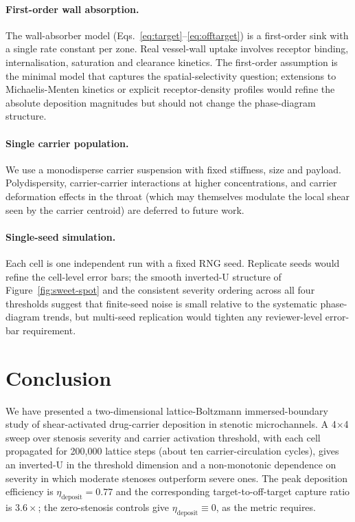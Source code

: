 \documentclass[11pt,a4paper]{article}
\begin{document}
\paragraph{First-order wall absorption.}
The wall-absorber model
(Eqs.~\ref{eq:target}--\ref{eq:offtarget}) is a first-order
sink with a single rate constant per zone. Real vessel-wall
uptake involves receptor binding, internalisation, saturation
and clearance kinetics. The first-order assumption is the
minimal model that captures the spatial-selectivity question;
extensions to Michaelis-Menten kinetics or explicit
receptor-density profiles would refine the absolute deposition
magnitudes but should not change the phase-diagram structure.

\paragraph{Single carrier population.}
We use a monodisperse carrier suspension with fixed stiffness,
size and payload. Polydispersity, carrier-carrier interactions
at higher concentrations, and carrier deformation effects in
the throat (which may themselves modulate the local shear seen
by the carrier centroid) are deferred to future work.

\paragraph{Single-seed simulation.}
Each cell is one independent run with a fixed RNG seed.
Replicate seeds would refine the cell-level error bars; the
smooth inverted-U structure of Figure~\ref{fig:sweet-spot} and
the consistent severity ordering across all four thresholds
suggest that finite-seed noise is small relative to the
systematic phase-diagram trends, but multi-seed replication
would tighten any reviewer-level error-bar requirement.

\section{Conclusion}
\label{sec:conclusion}

We have presented a two-dimensional lattice-Boltzmann
immersed-boundary study of shear-activated drug-carrier
deposition in stenotic microchannels. A 4$\times$4 sweep over
stenosis severity and carrier activation threshold, with each
cell propagated for 200{,}000 lattice steps (about ten
carrier-circulation cycles), gives an inverted-U in the
threshold dimension and a non-monotonic dependence on severity
in which moderate stenoses outperform severe ones. The peak
deposition efficiency is $\eta_{\text{deposit}} = 0.77$ and the
corresponding target-to-off-target capture ratio is $3.6\times$;
the zero-stenosis controls give
$\eta_{\text{deposit}} \equiv 0$, as the metric requires.
\end{document}
